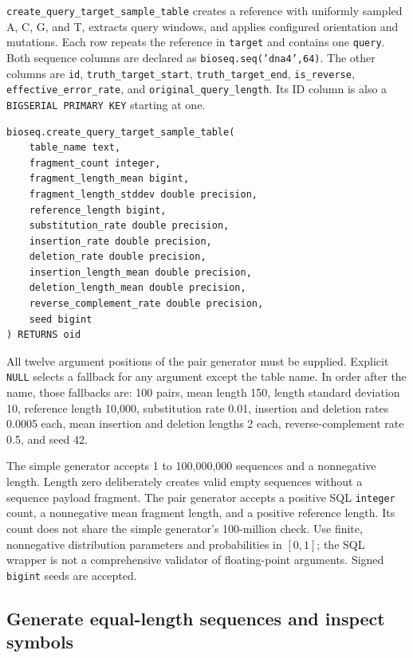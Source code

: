\texttt{create\_query\_target\_sample\_table} creates a reference with
uniformly sampled A, C, G, and T,
extracts query windows, and applies configured orientation and mutations.
Each row repeats the reference in \texttt{target} and contains one
\texttt{query}. Both sequence columns are declared as
\texttt{bioseq.seq('dna4',64)}. The other columns are \texttt{id},
\texttt{truth\_target\_start}, \texttt{truth\_target\_end},
\texttt{is\_reverse}, \texttt{effective\_error\_rate}, and
\texttt{original\_query\_length}. Its ID column is also a
\texttt{BIGSERIAL PRIMARY KEY} starting at one.
\par\noindent\begin{minipage}{\linewidth}
\begin{lstlisting}[style=bioseq-appendix-sql]
bioseq.create_query_target_sample_table(
    table_name text,
    fragment_count integer,
    fragment_length_mean bigint,
    fragment_length_stddev double precision,
    reference_length bigint,
    substitution_rate double precision,
    insertion_rate double precision,
    deletion_rate double precision,
    insertion_length_mean double precision,
    deletion_length_mean double precision,
    reverse_complement_rate double precision,
    seed bigint
) RETURNS oid
\end{lstlisting}
\end{minipage}

All twelve argument positions of the pair generator must be supplied.
Explicit \texttt{NULL} selects a fallback for any argument except the table
name. In order after the name, those fallbacks are: 100 pairs, mean length
150, length standard deviation 10, reference length 10,000, substitution rate
0.01, insertion and deletion rates 0.0005 each, mean insertion and deletion
lengths 2 each, reverse-complement rate 0.5, and seed 42.

The simple generator accepts 1 to 100,000,000 sequences and a nonnegative
length. Length zero deliberately creates valid empty sequences without a
sequence payload fragment. The pair
generator accepts a positive SQL \texttt{integer} count, a nonnegative mean
fragment length, and a positive reference length. Its count does not share
the simple generator's 100-million check. Use finite, nonnegative
distribution parameters and probabilities in $[0,1]$; the SQL wrapper is not
a comprehensive validator of floating-point arguments. Signed \texttt{bigint}
seeds are accepted.

\subsection{Generate equal-length sequences and inspect symbols}

